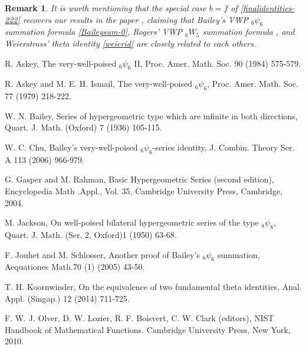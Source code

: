 \documentclass[xits,review,sort&compress]{elsarticle}
\newtheorem{remark}[dl]{Remark}
\numberwithin{equation}{section}
\begin{document}
\begin{remark} It is worth mentioning that the special case $b=f$ of \eqref{finalidentities-222} recovers our results in the paper \cite[Thm. 6 and Thm. 7]{wangjinphd}, claiming that Bailey's VWP ${}_6\psi_6$ summation formula \eqref{Baileysum-0}, Rogers' VWP ${}_6W_5$   summation formula \cite[(II.20)]{10}, and Weierstrass' theta identity \eqref{weierid} are closely related to each others.
\end{remark}
\begin{thebibliography}{2005}
 R. Askey, The very-well-poised ${}_6\psi_6$ II, Proc. Amer. Math. Soc. 90 (1984) 575-579.

R. Askey and M. E. H. Ismail, The very-well-poised ${}_6\psi_6$, Proc. Amer. Math. Soc. 77 (1979) 218-222.

W. N. Bailey, Series of hypergeometric type which are infinite in both directions, Quart. J. Math.  (Oxford) 7 (1936) 105-115.

W. C. Chu, Bailey's very-well-poised ${}_6\psi_6$-series identity, J. Combin. Theory Ser. A  113  (2006) 966-979.


 G. Gasper and M. Rahman, Basic Hypergeometric Series (second edition), Encyclopedia Math .Appl., Vol. 35, Cambridge University Press, Cambridge, 2004.

M. Jackson, On well-poised bilateral hypergeometric series of the type ${}_8\psi_8$, Quart. J. Math. (Ser. 2, Oxford)1 (1950) 63-68.



  F. Jouhet and M. Schlosser, Another proof of Bailey's ${}_6\psi_6$ summation, Aequationes Math.70 (1) (2005) 43-50.


T. H. Koornwinder, On the equivalence of two fundamental theta identities, Anal. Appl. (Singap.) 12 (2014) 711-725.


  F. W. J. Olver,   D. W. Lozier,  R. F. Boisvert,  C. W. Clark (editors), NIST Handbook of Mathematical Functions. Cambridge University Press, New York, 2010.



\end{thebibliography}
\end{document}
